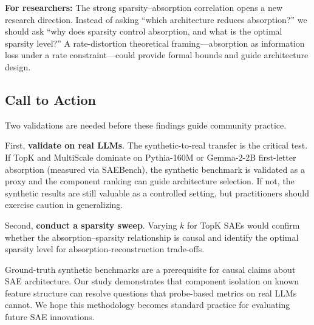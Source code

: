 \documentclass{article}
\begin{document}
\textbf{For researchers:} The strong sparsity--absorption correlation opens a new research direction. Instead of asking ``which architecture reduces absorption?'' we should ask ``why does sparsity control absorption, and what is the optimal sparsity level?'' A rate-distortion theoretical framing---absorption as information loss under a rate constraint---could provide formal bounds and guide architecture design.

\subsection{Call to Action}

Two validations are needed before these findings guide community practice.

First, \textbf{validate on real LLMs}. The synthetic-to-real transfer is the critical test. If TopK and MultiScale dominate on Pythia-160M or Gemma-2-2B first-letter absorption (measured via SAEBench), the synthetic benchmark is validated as a proxy and the component ranking can guide architecture selection. If not, the synthetic results are still valuable as a controlled setting, but practitioners should exercise caution in generalizing.

Second, \textbf{conduct a sparsity sweep}. Varying $k$ for TopK SAEs would confirm whether the absorption--sparsity relationship is causal and identify the optimal sparsity level for absorption-reconstruction trade-offs.

Ground-truth synthetic benchmarks are a prerequisite for causal claims about SAE architecture. Our study demonstrates that component isolation on known feature structure can resolve questions that probe-based metrics on real LLMs cannot. We hope this methodology becomes standard practice for evaluating future SAE innovations.



\end{document}

